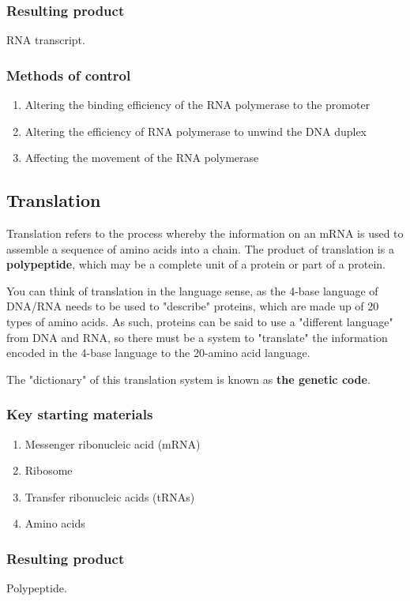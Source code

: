 \documentclass[11pt]{article}
\begin{document}
\subsubsection{Resulting product}
\label{sec:org81fb694}
RNA transcript.
\subsubsection{Methods of control}
\label{sec:org73ad05f}
\begin{enumerate}
\item Altering the binding efficiency of the RNA polymerase to the promoter
\item Altering the efficiency of RNA polymerase to unwind the DNA duplex
\item Affecting the movement of the RNA polymerase
\end{enumerate}

\newpage
\subsection{Translation}
\label{sec:org4bd5507}
Translation refers to the process whereby the information on an mRNA is used to assemble a sequence of amino acids into a chain. The product of translation is a \textbf{polypeptide}, which may be a complete unit of a protein or part of a protein.


You can think of translation in the language sense, as the 4-base language of DNA/RNA needs to be used to "describe" proteins, which are made up of 20 types of amino acids. As such, proteins can be said to use a "different language" from DNA and RNA, so there must be a system to "translate" the information encoded in the 4-base language to the 20-amino acid language.


The "dictionary" of this translation system is known as \textbf{the genetic code}.
\subsubsection{Key starting materials}
\label{sec:orgad4c6f0}
\begin{enumerate}
\item Messenger ribonucleic acid (mRNA)
\item Ribosome
\item Transfer ribonucleic acids (tRNAs)
\item Amino acids
\end{enumerate}
\subsubsection{Resulting product}
\label{sec:org2b65ecd}
Polypeptide.
\end{document}
